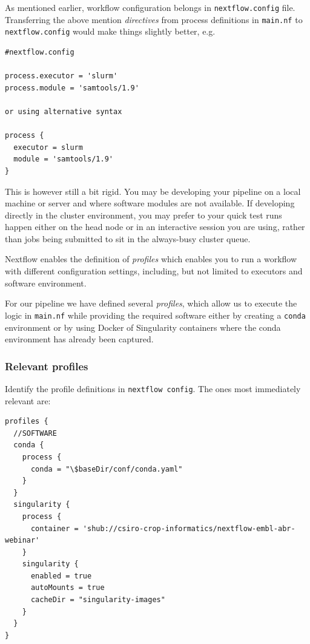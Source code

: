 As mentioned earlier, workflow configuration belongs in \texttt{nextflow.config} file. 
Transferring the above mention \emph{directives} from process definitions in \texttt{main.nf} 
to \texttt{nextflow.config} would make things slightly better, e.g.

\begin{lstlisting}
#nextflow.config

process.executor = 'slurm' 
process.module = 'samtools/1.9' 

or using alternative syntax

process {
  executor = slurm
  module = 'samtools/1.9'
}
\end{lstlisting}

This is however still a bit rigid. You may be developing your pipeline on a local machine or server and 
where software modules are not available. 
If developing directly in the cluster environment, you may prefer to your quick test runs 
happen either on the head node or in an interactive session you are using, rather than jobs being submitted to sit in the always-busy cluster queue.


Nextflow enables the definition of \emph{profiles} which enables you to run a workflow 
with different configuration settings, including, but not limited to executors and software environment.

For our pipeline we have defined several \emph{profiles}, which allow us to execute the logic in \texttt{main.nf} while providing the required software either by creating a \texttt{conda} environment or by using Docker of Singularity containers where the conda environment has already been captured. 

\subsubsection{Relevant profiles}


Identify the profile definitions in \texttt{nextflow config}. The ones most immediately relevant are:
\begin{lstlisting}
profiles {
  //SOFTWARE
  conda {
    process {
      conda = "\$baseDir/conf/conda.yaml"
    }
  }
  singularity {
    process {
      container = 'shub://csiro-crop-informatics/nextflow-embl-abr-webinar' 
    }
    singularity {
      enabled = true
      autoMounts = true
      cacheDir = "singularity-images"  
    }
  }
}
\end{lstlisting}



